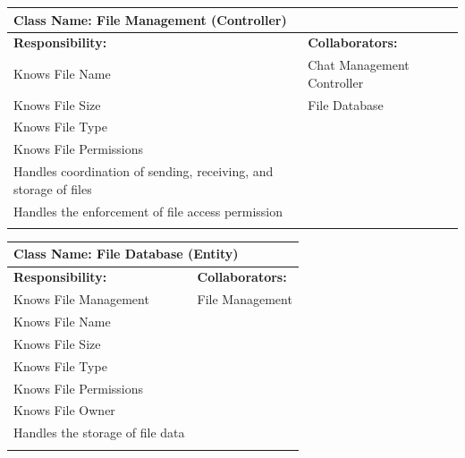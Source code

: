 \documentclass[]{article}
\begin{document}
	\begin{table}[ht]
		\centering
		\begin{tabular}{|p{7cm}|p{7cm}|}
		\hline 
		 \multicolumn{2}{|l|}{\textbf{Class Name:} File Management (Controller)} \\
		\hline
		\textbf{Responsibility:} & \textbf{Collaborators:} \\
		\hline
			Knows File Name & Chat Management Controller\\
			Knows File Size & File Database\\
			Knows File Type &\\
			Knows File Permissions &\\
			Handles coordination of sending, receiving, and storage of files &\\
			Handles the enforcement of file access permission &\\
		\vspace{0.1in} & \\
		\hline
		\end{tabular}
	\end{table}


	\begin{table}[ht]
		\centering
		\begin{tabular}{|p{7cm}|p{7cm}|}
		\hline 
		 \multicolumn{2}{|l|}{\textbf{Class Name:} File Database (Entity)} \\
		\hline
		\textbf{Responsibility:} & \textbf{Collaborators:} \\
		\hline
			Knows File Management & File Management \\
			Knows File Name &\\
			Knows File Size &\\
			Knows File Type &\\
			Knows File Permissions &\\
			Knows File Owner &\\
			Handles the storage of file data &\\
		\vspace{0.1in} & \\
		\hline
		\end{tabular}
	\end{table}
\end{document}
